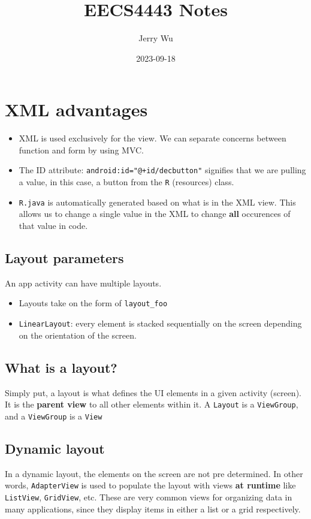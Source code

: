 \documentclass[12pt]{book}
\title{EECS4443 Notes}
\author{Jerry Wu}
\date{2023-09-18}
\begin{document}
\maketitle

\section*{XML advantages}


\begin{itemize}
    \item XML is used exclusively for the view. We can separate concerns between function and form by using MVC.
    \item The ID attribute: \texttt{android:id="@+id/decbutton"} signifies that we are pulling a value, in this case, a button from the \texttt{R} (resources) class. 
    \item \texttt{R.java} is automatically generated based on what is in the XML view. This allows us to change a single value in the XML to change \textbf{all} occurences of that value in code.
\end{itemize}

\subsection*{Layout parameters}
An app activity can have multiple layouts.
\begin{itemize}
  \item Layouts take on the form of \texttt{layout\_foo}
  \item \texttt{LinearLayout}: every element is stacked sequentially on the screen depending on the orientation of the screen.
\end{itemize}

\subsection*{What is a layout?}
Simply put, a layout is what defines the UI elements in a given activity (screen). It is the \textbf{parent view} to all other elements within it. A \texttt{Layout} is a \texttt{ViewGroup}, and a \texttt{ViewGroup} is a \texttt{View}

\subsection*{Dynamic layout}
In a dynamic layout, the elements on the screen are not pre determined. In other words, \texttt{AdapterView} is used to populate the layout with views \textbf{at runtime} like \texttt{ListView}, \texttt{GridView}, etc. These are very common views for organizing data in many applications, since they display items in either a list or a grid respectively.
\end{document}

